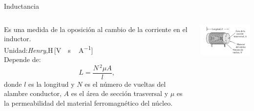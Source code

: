 \documentclass[aspectratio=169]{beamer}
\begin{document}
\begin{frame}{Inductancia}
    \begin{columns}[onlytextwidth]
    \begin{column}{0.6\textwidth}
        Es una medida de la oposición al cambio de la corriente en el inductor.\\[6pt]
        Unidad:\hspace{6pt}\emph{Henry},\hspace{6pt}\si{\henry}\,[\si{\volt\cdot \second\,\ampere^{-1}}]\\[6pt]
        Depende de:
        \begin{equation*}
            L = \frac{N\,^2 \mu A}{l},
        \end{equation*}
        donde $l$ es la longitud y $N$ es el número de vueltas del alambre conductor, $A$ es el área de sección trasversal y $\mu$ es la permeabilidad del material ferromagnético del núcleo. 
    \end{column}
    \begin{column}{0.4\textwidth}
    \begin{center}
        \includegraphics[scale=0.8]{fig/inductor.png}
    \end{center}
    \flushright \cite{charles2013fundamentos}
\end{column}
\end{columns}
\end{frame}
\end{document}
